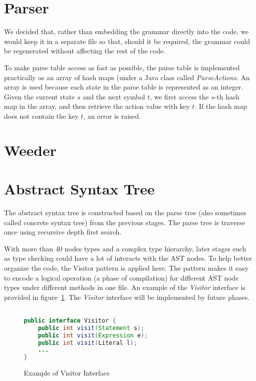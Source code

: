\section{Parser}

We decided that, rather than embedding the grammar directly into the code, we would keep it in a separate file so that,
  should it be required, the grammar could be regenerated without affecting the rest of the code.

To make parse table access as fast as possible, the parse table is implemented practically as an array of hash maps (under a Java class called \emph{ParseActions}. An array is used because each state in the parse table is represented as an integer. Given the current state $s$ and the next symbol $t$, we first access the $s$-th hash map in the array, and then retrieve the action value with key $t$. If the hash map does not contain the key $t$, an error is raised. 

\section{Weeder}

\section{Abstract Syntax Tree }
The abstract syntax tree is constructed based on the parse tree (also sometimes called concrete syntax tree) from the previous stages. The parse tree is traverse once using recursive depth first search.

With more than 40 nodes types and a complex type hierarchy, later stages such as type checking could have a lot of interacts with the AST nodes. To help better organize the code, the Visitor pattern is applied here. The pattern makes it easy to encode a logical operation (a phase of compilation) for different AST node types under different methods in one file. An example of the \emph{Visitor} interface is provided in figure~\ref{visitor}. The \emph{Visitor} interface will be implemented by future phases.

\begin{figure}

\begin{lstlisting}[language=Java, frame=single]  % Start your code-block

public interface Visitor {
	public int visit(Statement s);
	public int visit(Expression e);
	public int visit(Literal l);
	...
}
\end{lstlisting}
\caption{Example of Visitor Interface}
\label{visitor}
\end{figure}